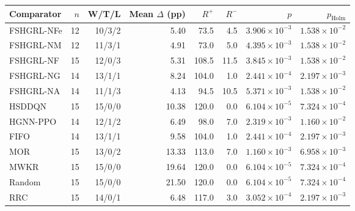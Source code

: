 \begin{tabular}{lrrrrrrr}
\toprule
Comparator & $n$ & W/T/L & Mean $\Delta$ (pp) & $R^+$ & $R^-$ & $p$ & $p_{\mathrm{Holm}}$ \\
\midrule
FSHGRL-NFe & 12 & 10/3/2 & 5.40 & 73.5 & 4.5 & $3.906\times10^{-3}$ & $1.538\times10^{-2}$ \\
FSHGRL-NM & 12 & 11/3/1 & 4.91 & 73.0 & 5.0 & $4.395\times10^{-3}$ & $1.538\times10^{-2}$ \\
FSHGRL-NF & 15 & 12/0/3 & 5.31 & 108.5 & 11.5 & $3.845\times10^{-3}$ & $1.538\times10^{-2}$ \\
FSHGRL-NG & 14 & 13/1/1 & 8.24 & 104.0 & 1.0 & $2.441\times10^{-4}$ & $2.197\times10^{-3}$ \\
FSHGRL-NA & 14 & 11/1/3 & 4.13 & 94.5 & 10.5 & $5.371\times10^{-3}$ & $1.538\times10^{-2}$ \\
HSDDQN & 15 & 15/0/0 & 10.38 & 120.0 & 0.0 & $6.104\times10^{-5}$ & $7.324\times10^{-4}$ \\
HGNN-PPO & 14 & 12/1/2 & 6.49 & 98.0 & 7.0 & $2.319\times10^{-3}$ & $1.160\times10^{-2}$ \\
FIFO & 14 & 13/1/1 & 9.58 & 104.0 & 1.0 & $2.441\times10^{-4}$ & $2.197\times10^{-3}$ \\
MOR & 15 & 13/0/2 & 13.33 & 113.0 & 7.0 & $1.160\times10^{-3}$ & $6.958\times10^{-3}$ \\
MWKR & 15 & 15/0/0 & 19.64 & 120.0 & 0.0 & $6.104\times10^{-5}$ & $7.324\times10^{-4}$ \\
Random & 15 & 15/0/0 & 21.50 & 120.0 & 0.0 & $6.104\times10^{-5}$ & $7.324\times10^{-4}$ \\
RRC & 15 & 14/0/1 & 6.48 & 117.0 & 3.0 & $3.052\times10^{-4}$ & $2.197\times10^{-3}$ \\
\bottomrule
\end{tabular}
